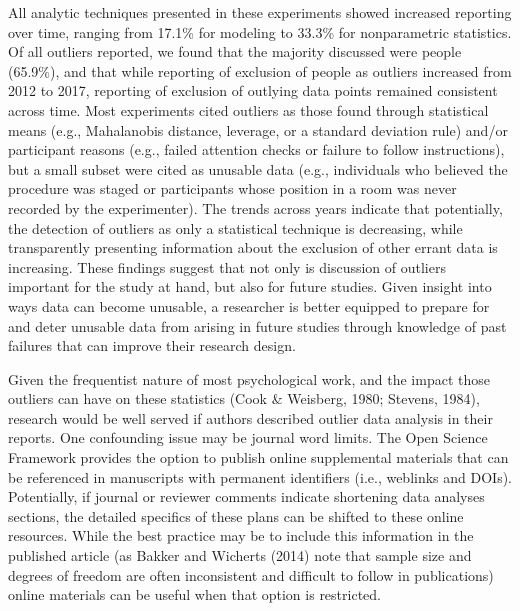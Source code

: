\documentclass[english,,man]{apa6}
\begin{document}
All analytic techniques presented in these experiments showed increased reporting over time, ranging from 17.1\% for modeling to 33.3\% for nonparametric statistics. Of all outliers reported, we found that the majority discussed were people (65.9\%), and that while reporting of exclusion of people as outliers increased from 2012 to 2017, reporting of exclusion of outlying data points remained consistent across time. Most experiments cited outliers as those found through statistical means (e.g., Mahalanobis distance, leverage, or a standard deviation rule) and/or participant reasons (e.g., failed attention checks or failure to follow instructions), but a small subset were cited as unusable data (e.g., individuals who believed the procedure was staged or participants whose position in a room was never recorded by the experimenter). The trends across years indicate that potentially, the detection of outliers as only a statistical technique is decreasing, while transparently presenting information about the exclusion of other errant data is increasing. These findings suggest that not only is discussion of outliers important for the study at hand, but also for future studies. Given insight into ways data can become unusable, a researcher is better equipped to prepare for and deter unusable data from arising in future studies through knowledge of past failures that can improve their research design.

Given the frequentist nature of most psychological work, and the impact those outliers can have on these statistics (Cook \& Weisberg, 1980; Stevens, 1984), research would be well served if authors described outlier data analysis in their reports. One confounding issue may be journal word limits. The Open Science Framework provides the option to publish online supplemental materials that can be referenced in manuscripts with permanent identifiers (i.e., weblinks and DOIs). Potentially, if journal or reviewer comments indicate shortening data analyses sections, the detailed specifics of these plans can be shifted to these online resources. While the best practice may be to include this information in the published article (as Bakker and Wicherts (2014) note that sample size and degrees of freedom are often inconsistent and difficult to follow in publications) online materials can be useful when that option is restricted.
\end{document}
